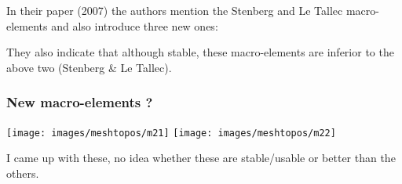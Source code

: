 In their paper \textcite{qizh07} (2007) the authors mention the Stenberg and Le Tallec
macro-elements and also introduce three new ones:

\begin{minipage}{0.31\textwidth}

\end{minipage}\hfill 
\begin{minipage}{0.31\textwidth}

\end{minipage}\hfill 
\begin{minipage}{0.31\textwidth}

\end{minipage}

They also indicate that although stable, these macro-elements are inferior 
to the above two (Stenberg \& Le Tallec). 

\subsubsection{New macro-elements ?}

\begin{center}
\texttt{[image: images/meshtopos/m21]}
\texttt{[image: images/meshtopos/m22]}
\end{center}

I came up with these, no idea whether these are stable/usable or better than the others.



